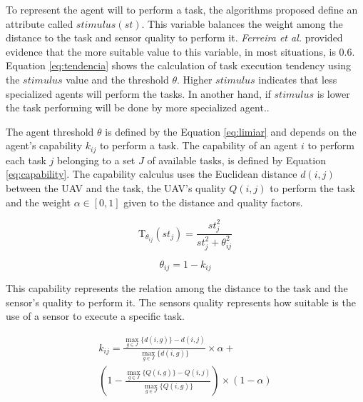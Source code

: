 To represent the agent will to perform a task, the algorithms proposed define an attribute called $stimulus (st)$. This variable balances the weight among the distance to the task and sensor quality to perform it. \textit{Ferreira et al.}\cite{ferreira2007swarm} provided evidence that the more suitable value to this variable, in most situations, is $0.6$. Equation \ref{eq:tendencia} shows the calculation of task execution tendency using the $stimulus$ value and the threshold $\theta$. Higher $stimulus$ indicates that less specialized agents will perform the tasks. In another hand, if $stimulus$ is lower the task performing will be done by more specialized agent.\cite{bonabeau1999swarm}. 

The agent threshold $\theta$ is defined by the Equation \ref{eq:limiar} and depends on the agent's capability $k_{ij}$ to perform a task. The capability of an agent $i$ to perform each task $j$ belonging to a set $J$ of available tasks, is defined by Equation \ref{eq:capability}. The capability calculus uses the Euclidean distance $d(i,j)$ between the UAV and the task, the UAV's quality $Q(i,j)$ to perform the task and the weight $\alpha \in [0,1]$ given to the distance and quality factors. 

\begin{equation} \label{eq:tendencia}
	\textrm{T}_{\theta_{ij}}(st_j) = \frac{st_{j}^2}{st_{j}^2 + \theta_{ij}^2}
\end{equation}

\begin{equation} \label{eq:limiar}
	\theta_{ij} = 1 - k_{ij}
\end{equation}

This capability represents the relation among the distance to the task and the sensor's quality to perform it. The sensors quality represents how suitable is the use of a sensor to execute a specific task.

\begin{equation} \label{eq:capability}
\begin{split}
k_{ij} = \frac{\max_{g \in J} \{d(i,g)\} - d(i,j)}{\max_{g \in J} \{d(i,g)\}} \times \alpha + \\
(1 - \frac{\max_{g \in J} \{Q(i,g)\} - Q(i,j)}{\max_{g \in J} \{Q(i,g)\}}) \times (1-\alpha)
\end{split}
\end{equation}


